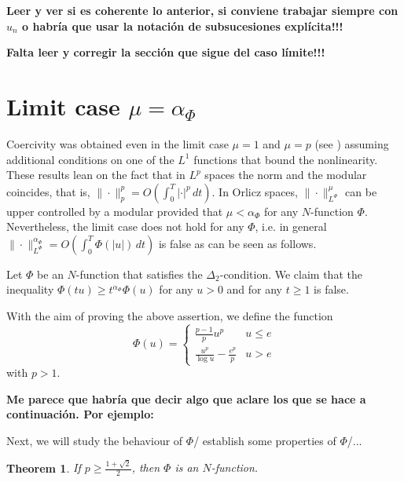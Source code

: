 \documentclass[twoside]{article}
\newtheorem{thm}{Theorem}[section]
\theoremstyle{remark}
\newcommand{\orlnor}{\|_{L^{\Phi}}}
\renewcommand{\leq}{\leqslant}
\begin{document}
{\bf Leer y ver si es coherente lo anterior,  si conviene trabajar siempre con $u_n$ o habr\'ia que usar la notaci\'on de subsucesiones expl\'icita!!!}

{\bf Falta leer y corregir la  secci\'on que sigue del caso l\'imite!!!}

\section{Limit case $\mu=\alpha_{\Phi}$}

Coercivity was obtained even in the limit case $\mu=1$ and   $\mu=p$ 
(see \cite{zhao2004periodic, tang2010periodic})
assuming additional conditions on one of the $L^1$ 
functions that bound the nonlinearity.
These results lean on the fact that in $L^p$ spaces the norm and the modular coincides, 
that is, $\|\cdot\|_p^p=O(\int_0^T |\cdot|^p\,dt)$.
In Orlicz spaces, $\|\cdot\orlnor^\mu$ can be upper controlled by a modular provided that $\mu<\alpha_{\Phi}$ for any
$N$-function $\Phi$. 
Nevertheless,  the limit case does  not hold for any $\Phi$, i.e. in general $\|\cdot\orlnor^{\alpha_{\Phi}}=O(\int_0^T \Phi(|u|)\,dt)$ is false as can be seen as follows.


Let $\Phi$ be an $N$-function that satisfies the $\Delta_2$-condition. 
We claim that the inequality $\Phi(tu)\geq t^{\alpha_{\Phi}}\Phi(u)$ for any $u>0$ and for any $t\geq 1$ is false.

With the aim of proving the above assertion, we define the function 
\[\Phi(u)=
\left\{
\begin{array}{ll}
\frac{p-1}{p}u^p&u\leq e
\\
\frac{u^p}{\log u}-\frac{e^p}{p}&u>e
\end{array}
\right.\]
with $p>1$.

{\bf  Me parece que habr\'ia que decir algo que aclare los que se hace a continuaci\'on. 
Por ejemplo: 

Next, we will study the behaviour of $\Phi$/ establish some properties of $\Phi$/...}

\begin{thm}
If $p\geq \frac{1+\sqrt 2}{2}$, then $\Phi$ is an $N$-function.
\end{thm}
\end{document}
